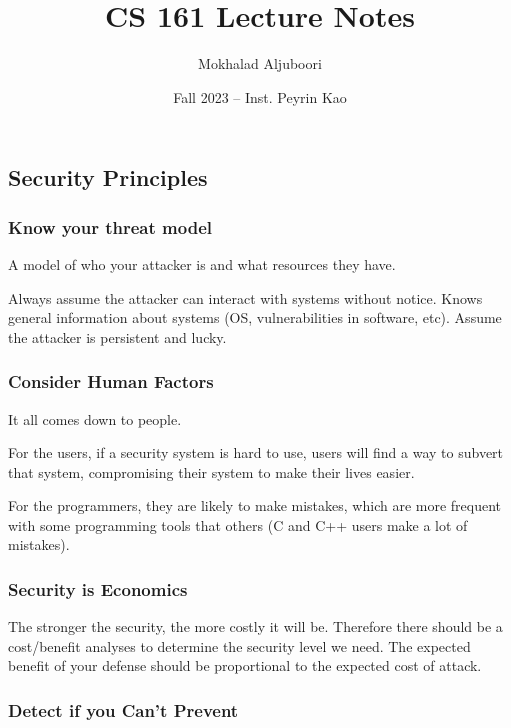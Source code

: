 \documentclass{article}
\title{CS 161 Lecture Notes}
\author{Mokhalad Aljuboori}
\date{Fall 2023 -- Inst. Peyrin Kao}
\begin{document}
\maketitle


\subsection{Security Principles}
\subsubsection{Know your threat model}

\begin{definition}
    A model of who your attacker is and what resources they have.
\end{definition}

Always assume the attacker can interact with systems without notice. Knows general information about systems (OS, vulnerabilities in software, etc). Assume the attacker is persistent and lucky.

\subsubsection{Consider Human Factors}
It all comes down to people.

For the users, if a security system is hard to use, users will find a way to subvert that system, compromising their system to make their lives easier.

For the programmers, they are likely to make mistakes, which are more frequent with some programming tools that others (C and C++ users make a lot of mistakes).

\subsubsection{Security is Economics}
The stronger the security, the more costly it will be. Therefore there should be a cost/benefit analyses to determine the security level we need. The expected benefit of your defense should be proportional to the expected cost of attack.

\subsubsection{Detect if you Can't Prevent}
\end{document}
